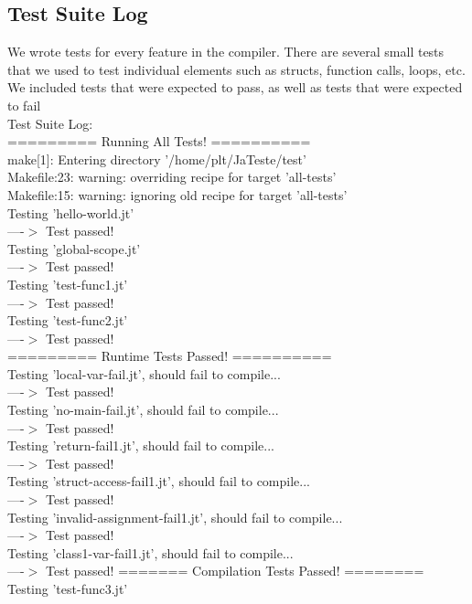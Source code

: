 \documentclass{article}
\begin{document}
\subsection{Test Suite Log}
We wrote tests for every feature in the compiler. There are several small tests that we used to test individual elements such as structs, function calls, loops, etc. We included tests that were expected to pass, as well as tests that were expected to fail\\
Test Suite Log:\\
========= Running All Tests! ========== \\
make[1]: Entering directory '/home/plt/JaTeste/test' \\
Makefile:23: warning: overriding recipe for target 'all-tests' \\
Makefile:15: warning: ignoring old recipe for target 'all-tests' \\
Testing 'hello-world.jt' \\
  ----$>$  Test passed!\\
Testing 'global-scope.jt'\\
  ----$>$  Test passed!\\
Testing 'test-func1.jt'\\
  ----$>$  Test passed!\\
Testing 'test-func2.jt'\\
  ----$>$  Test passed!\\
========= Runtime Tests Passed! ==========\\
Testing 'local-var-fail.jt', should fail to compile...\\
  ----$>$  Test passed!\\
Testing 'no-main-fail.jt', should fail to compile...\\
  ----$>$  Test passed!\\
Testing 'return-fail1.jt', should fail to compile...\\
  ----$>$  Test passed!\\
Testing 'struct-access-fail1.jt', should fail to compile...\\
  ----$>$  Test passed!\\
Testing 'invalid-assignment-fail1.jt', should fail to compile...\\
  ----$>$  Test passed!\\
  Testing 'class1-var-fail1.jt', should fail to compile...\\
  ----$>$  Test passed!
======= Compilation Tests Passed! ========\\
Testing 'test-func3.jt'\\
\end{document}
